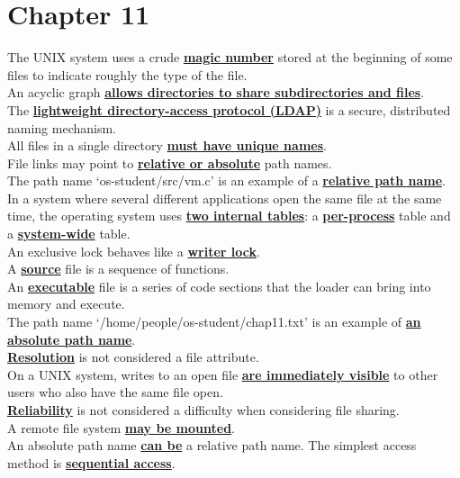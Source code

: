 \documentclass[10pt]{article}
\newcommand{\qw}[1]{\textbf{\ul{#1}}}
\begin{document}
\section*{\centering Chapter 11}
The UNIX system uses a crude \qw{magic number} stored at the beginning of some files to indicate roughly the type of the file.\\[2mm]
An acyclic graph \qw{allows directories to share subdirectories and files}.\\[2mm]
The \qw{lightweight directory-access protocol (LDAP)} is a secure, distributed naming mechanism.\\[2mm]
All files in a single directory \qw{must have unique names}.\\[2mm]
File links may point to \qw{relative or absolute} path names.\\[2mm]
The path name `os-student/src/vm.c' is an example of a \qw{relative path name}.\\[2mm]
In a system where several different applications open the same file at the same time, the operating system uses \qw{two internal tables}: a \qw{per-process} table and a \qw{system-wide} table.\\[2mm]
An exclusive lock behaves like a \qw{writer lock}.\\[2mm]
A \qw{source} file is a sequence of functions.\\[2mm]
An \qw{executable} file is a series of code sections that the loader can bring into memory and execute.\\[2mm]
The path name `/home/people/os-student/chap11.txt' is an example of \qw{an absolute path name}.\\[2mm]
\qw{Resolution} is not considered a file attribute.\\[2mm]
On a UNIX system, writes to an open file \qw{are immediately visible} to other users who also have the same file open.\\[2mm]
\qw{Reliability} is not considered a difficulty when considering file sharing.\\[2mm]
A remote file system \qw{may be mounted}.\\[2mm]
An absolute path name \qw{can be} a relative path name.
The simplest access method is \qw{sequential access}.
\newpage
\end{document}

